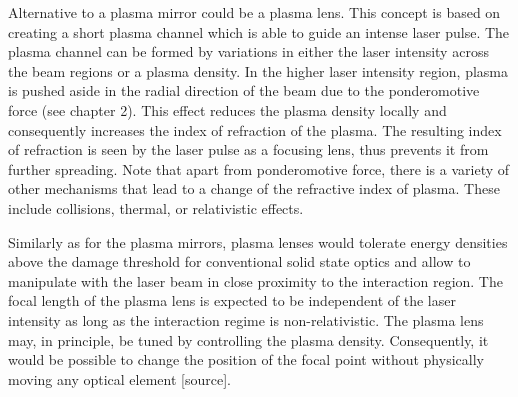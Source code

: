 Alternative to a plasma mirror could be a plasma lens. This concept is based on creating a short plasma channel which is able to guide an intense laser pulse. The plasma channel can be formed by variations in either the laser intensity across the beam regions or a plasma density. In the higher laser intensity region, plasma is pushed aside in the radial direction of the beam due to the ponderomotive force (see chapter 2). This effect reduces the plasma density locally and consequently increases the index of refraction of the plasma. The resulting index of refraction is seen by the laser pulse as a focusing lens, thus prevents it from further spreading. Note that apart from ponderomotive force, there is a variety of other mechanisms that lead to a change of the refractive index of plasma. These include collisions, thermal, or relativistic effects.

Similarly as for the plasma mirrors, plasma lenses would tolerate energy densities above the damage threshold for conventional solid state optics and allow to manipulate with the laser beam in close proximity to the interaction region. The focal length of the plasma lens is expected to be independent of the laser intensity as long as the interaction regime is non-relativistic. The plasma lens may, in principle, be tuned by controlling the plasma density. Consequently, it would be possible to change the position of the focal point without physically moving any optical element [source].